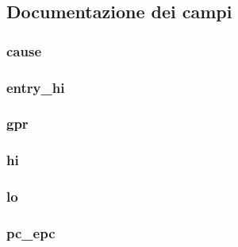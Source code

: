 \subsection{Documentazione dei campi}
\hypertarget{structstate__t_a977139f16407ef0c648e940dabe05318}{
\subsubsection[{cause}]{ cause}}\label{structstate__t_a977139f16407ef0c648e940dabe05318}
\hypertarget{structstate__t_a867e8a3789b0868e6fe3cb734b8d7e34}{
\subsubsection[{entry\-\_\-hi}]{ entry\-\_\-hi}}\label{structstate__t_a867e8a3789b0868e6fe3cb734b8d7e34}
\hypertarget{structstate__t_a42033ce9f27270ef281d89603922dcab}{
\subsubsection[{gpr}]{ gpr}}\label{structstate__t_a42033ce9f27270ef281d89603922dcab}
\hypertarget{structstate__t_a0e34aeb4eba44f3971bb1bf383435897}{
\subsubsection[{hi}]{ hi}}\label{structstate__t_a0e34aeb4eba44f3971bb1bf383435897}
\hypertarget{structstate__t_a55f6b3c956fb70c8ef13c4a00ccd3a7b}{
\subsubsection[{lo}]{ lo}}\label{structstate__t_a55f6b3c956fb70c8ef13c4a00ccd3a7b}
\hypertarget{structstate__t_ac0cfee10c7a13bb3749604cd15892217}{
\subsubsection[{pc\-\_\-epc}]{ pc\-\_\-epc}}\label{structstate__t_ac0cfee10c7a13bb3749604cd15892217}
